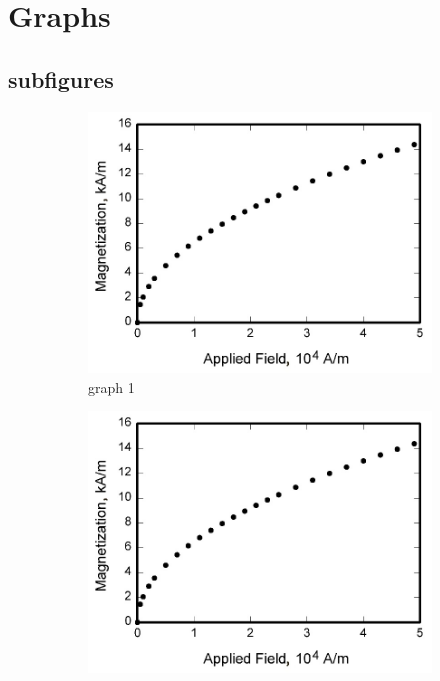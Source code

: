 \endgroup


\section{Graphs}

\subsection{subfigures}
\begin{figure}[H]
    \centering
    \begin{subfigure}[t]{0.48\textwidth}
        \centering
        \includegraphics[width=1.0\textwidth]{Images/graph.jpg}
        \caption{graph 1}
        \label{subfig:graph1}
    \end{subfigure}
    \hfill
    \begin{subfigure}[t]{0.48\textwidth}
        \centering
        \includegraphics[width=1.0\textwidth]{Images/graph.jpg}

\end{subfigure}
\end{figure}
